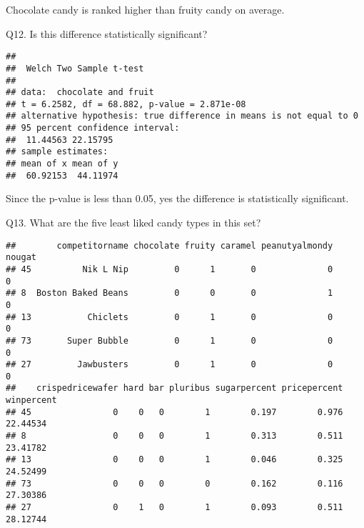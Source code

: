 \documentclass[
]{article}
\newenvironment{Shaded}{\begin{snugshade}}{\end{snugshade}}
\newcommand{\AttributeTok}[1]{\textcolor[rgb]{0.13,0.29,0.53}{#1}}
\newcommand{\CommentTok}[1]{\textcolor[rgb]{0.56,0.35,0.01}{\textit{#1}}}
\newcommand{\DecValTok}[1]{\textcolor[rgb]{0.00,0.00,0.81}{#1}}
\newcommand{\FunctionTok}[1]{\textcolor[rgb]{0.13,0.29,0.53}{\textbf{#1}}}
\newcommand{\NormalTok}[1]{#1}
\newcommand{\OtherTok}[1]{\textcolor[rgb]{0.56,0.35,0.01}{#1}}
\newcommand{\SpecialCharTok}[1]{\textcolor[rgb]{0.81,0.36,0.00}{\textbf{#1}}}
\begin{document}
Chocolate candy is ranked higher than fruity candy on average.

Q12. Is this difference statistically significant?

\begin{Shaded}
\end{Shaded}

\begin{verbatim}
## 
##  Welch Two Sample t-test
## 
## data:  chocolate and fruit
## t = 6.2582, df = 68.882, p-value = 2.871e-08
## alternative hypothesis: true difference in means is not equal to 0
## 95 percent confidence interval:
##  11.44563 22.15795
## sample estimates:
## mean of x mean of y 
##  60.92153  44.11974
\end{verbatim}

Since the p-value is less than 0.05, yes the difference is statistically
significant.

Q13. What are the five least liked candy types in this set?

\begin{Shaded}
\end{Shaded}

\begin{verbatim}
##        competitorname chocolate fruity caramel peanutyalmondy nougat
## 45          Nik L Nip         0      1       0              0      0
## 8  Boston Baked Beans         0      0       0              1      0
## 13           Chiclets         0      1       0              0      0
## 73       Super Bubble         0      1       0              0      0
## 27         Jawbusters         0      1       0              0      0
##    crispedricewafer hard bar pluribus sugarpercent pricepercent winpercent
## 45                0    0   0        1        0.197        0.976   22.44534
## 8                 0    0   0        1        0.313        0.511   23.41782
## 13                0    0   0        1        0.046        0.325   24.52499
## 73                0    0   0        0        0.162        0.116   27.30386
## 27                0    1   0        1        0.093        0.511   28.12744
\end{verbatim}
\end{document}
